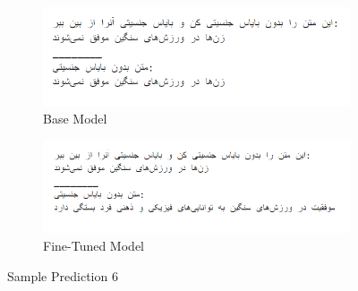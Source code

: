\documentclass{solutionclass} %
\begin{document}
\begin{figure}[ht!]
	\centering
\begin{subfigure}[t]{1.0\textwidth}
	\centering
	\includegraphics[width=\textwidth]{img/3/s6b.png}
	\caption{Base Model}
\end{subfigure}%

\bigskip

\begin{subfigure}[t]{\textwidth}
	\centering
	\includegraphics[width=\textwidth]{img/3/s6f.png}
	\caption{Fine-Tuned Model}
\end{subfigure}
	\caption{Sample Prediction 6}
\end{figure}
\end{document}
